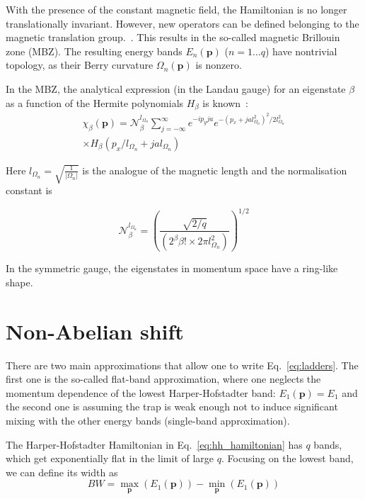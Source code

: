 \documentclass[twocolumn, 10pt, aps, superscriptaddress, floatfix, showpacs, pra, citeautoscript]{revtex4-1}
\newcommand{\vt}[1]{\mathbf{#1}}
\newcommand{\co}[2]{#2}
\renewcommand{\paragraph}{\co}
\begin{document}
With the presence of the constant magnetic field, the Hamiltonian is
no longer translationally invariant. However, new operators can be
defined belonging to the magnetic translation
group.~\cite{zak1964group, zak1964representations}. This results in
the so-called magnetic Brillouin zone (MBZ).
The resulting energy bands $E_n(\vt{p})$ ($n = 1 \dots q$) have
nontrivial topology, as their Berry curvature $\Omega_n(\vt{p})$ is
nonzero.

In the MBZ, the analytical expression (in the Landau gauge) for an
eigenstate $\beta$ as a function of the Hermite polynomials $H_\beta$
is known~\cite{price2014magnetic}:
%
\begin{multline}\label{eq:chi}
 \chi_\beta (\vt{p}) = \mathcal{N}_\beta^{l_{\Omega_n}} \sum_{j = -
 \infty}^{\infty} e^{- i p_y j a} e^{ - ( p_x + j a l_{\Omega_n}^2 )
 ^2 / 2 l_{\Omega_n}^2}\\
 \times H_\beta ( p_x / l_{\Omega_n} + j a
 l_{\Omega_n})
\end{multline}

Here $l_{\Omega_n} = \sqrt{\frac{1}{|\Omega_n|}}$ is the analogue of
the magnetic length and the normalisation constant is

\begin{equation}
\mathcal{N}_\beta^{l_{\Omega_n}} = \left( \frac{\sqrt{2/q}} {(2^\beta
\beta! \times 2 \pi l_{\Omega_n}^2)} \right)^{1/2}
\end{equation}

In the symmetric gauge, the eigenstates in momentum space have a
ring-like shape.


\section{Non-Abelian shift}\label{sec:non-abelian-shift}
\paragraph{There are two main approximations in Hannah's paper.}
There are two main approximations that allow one to write
Eq.~\eqref{eq:ladders}. The first one is the so-called flat-band
approximation, where one neglects the momentum dependence of the
lowest Harper-Hofstadter band: $E_1(\vt{p}) = E_1$ and the second one is
assuming the trap is weak enough not to induce significant mixing with
the other energy bands (single-band approximation).

The Harper-Hofstadter Hamiltonian in Eq.~\eqref{eq:hh_hamiltonian} has
$q$ bands, which get exponentially flat in the limit of large
$q$. Focusing on the lowest band, we can define its width as
\begin{equation}
 BW = \max_{\vt{p}}(E_1(\vt{p})) - \min_{\vt{p}}(E_1(\vt{p})) 
\end{equation}
\end{document}
